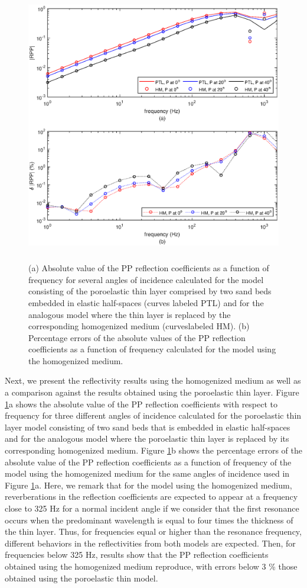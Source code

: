 \documentclass[draft]{agujournal2019}
\begin{document}
\begin{figure}[!ht]
\centering
        \includegraphics[width= 130mm, height=120mm]{Figure3.eps}
\caption{ (a) Absolute value of the PP reflection coefficients as a function of frequency for several angles of incidence calculated for the model consisting of the poroelastic thin layer comprised by two sand beds embedded in elastic half-spaces (curves labeled PTL) and for the analogous model where the thin layer is replaced by the corresponding homogenized medium (curveslabeled HM). (b) Percentage errors of the absolute values of the PP reflection coefficients as a function of frequency calculated for the model using the homogenized medium.}
\label{fig.3}
\end{figure}

Next, we present the reflectivity results using the homogenized medium as well as a comparison against the results obtained using the poroelastic thin layer. 
Figure \ref{fig.3}a shows the absolute value of the PP reflection coefficients with respect to frequency for three different angles of incidence calculated for the poroelastic thin layer model consisting of two sand beds that is embedded in elastic half-spaces and for the analogous model where the poroelastic thin layer is replaced by its corresponding homogenized medium.  
Figure \ref{fig.3}b shows the percentage errors of the absolute value of the PP reflection coefficients as a function of frequency of the model using the homogenized medium for the same angles of incidence used in Figure \ref{fig.3}a. 
Here, we remark that for the model using the homogenized medium, reverberations in the reflection coefficients are expected to appear at a frequency close to 325 Hz for a normal incident angle if we consider that the first resonance occurs when the predominant wavelength is  equal to four times the thickness of the thin layer. Thus, for frequencies equal or higher than the resonance frequency, different behaviors in the reflectivities from both models are expected. Then, for frequencies below 325 Hz, results show that the PP reflection coefficients obtained using the homogenized medium reproduce, with errors below 3 \% those obtained using the poroelastic thin model. 
\end{document}
